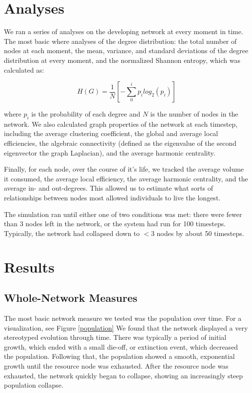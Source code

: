\documentclass{paper}
\begin{document}
	\section{Analyses}
	
	We ran a series of analyses on the developing network at every moment in time. The most basic where analyses of the degree distribution: the total number of nodes at each moment, the mean, variance, and standard deviations of the degree distribution at every moment, and the normalized Shannon entropy, which was calculated as:
	
	\[ H(G) = \frac{1}{N}[-\sum_{0}^{i} p_{i}log_{2}(p_{i})] \] 
	
	where $p_{i}$ is the probability of each degree and $N$ is the number of nodes in the network. We also calculated graph properties of the network at each timestep, including the average clustering coefficient, the global and average local efficiencies, the algebraic connectivity (defined as the eigenvalue of the second eigenvector the graph Laplacian), and the average harmonic centrality.
	
	Finally, for each node, over the course of it's life, we tracked the average volume it consumed, the average local efficiency, the average harmonic centrality, and the average in- and out-degrees. This allowed us to estimate what sorts of relationships between nodes most allowed individuals to live the longest. 
	
	The simulation ran until either one of two conditions was met: there were fewer than 3 nodes left in the network, or the system had run for 100 timesteps. Typically, the network had collapsed down to $<$3 nodes by about 50 timesteps. 
	
	\section{Results}
	
	
	\subsection{Whole-Network Measures}
	The most basic network measure we tested was the population over time. For a visualization, see Figure \ref{population} We found that the network displayed a very stereotyped evolution through time. There was typically a period of initial growth, which ended with a small die-off, or extinction event, which decreased the population. Following that, the population showed a smooth, exponential growth until the resource node was exhausted. After the resource node was exhausted, the network quickly began to collapse, showing an increasingly steep population collapse. 
		
\end{document}
